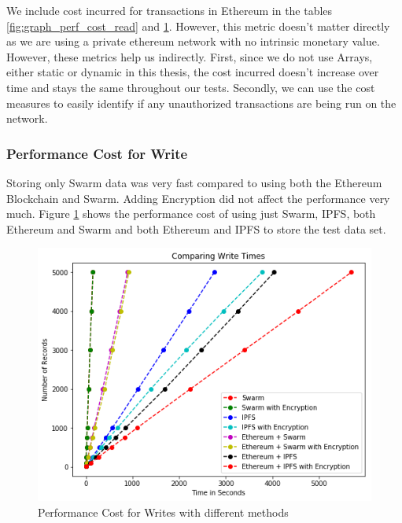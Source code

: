 \documentclass[11pt,openright]{report}
\begin{document}
\newline
\newline
We include cost incurred for transactions in Ethereum in the tables \ref{fig:graph_perf_cost_read} and \ref{fig:graph_perf_cost_write}. However, this metric doesn't matter directly as we are using a private ethereum network with no intrinsic monetary value. However, these metrics help us indirectly. First, since we do not use Arrays, either static or dynamic in this thesis, the cost incurred doesn't increase over time and stays the same throughout our tests. Secondly, we can use the cost measures to easily identify if any unauthorized transactions are being run on the network.

\subsubsection{Performance Cost for Write}
Storing only Swarm data was very fast compared to using both the Ethereum Blockchain and Swarm. Adding Encryption did not affect the performance very much. Figure \ref{fig:graph_perf_cost_write} shows the performance cost of using just Swarm, IPFS, both Ethereum and Swarm and both Ethereum and IPFS to store the test data set.
\newline
\newline
\begin{figure}[!htbp]
    \centering
    \includegraphics[scale=0.8]{results/graphs/WriteComp.png}
    \caption{Performance Cost for Writes with different methods}
    \label{fig:graph_perf_cost_write}
\end{figure}
\newline
\end{document}
